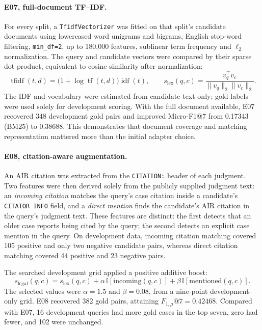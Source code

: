 \paragraph{E07, full-document TF--IDF.}
For every split, a \texttt{TfidfVectorizer} was fitted on that split's
candidate documents using lowercased word unigrams and bigrams,
English stop-word filtering, \texttt{min\_df=2}, up to 180,000 features,
sublinear term frequency and $\ell_2$ normalization. The query and candidate
vectors were compared by their sparse dot product, equivalent to cosine
similarity after normalization:
\begin{equation}
\operatorname{tfidf}(t,d)
=\bigl(1+\log \operatorname{tf}(t,d)\bigr)\operatorname{idf}(t),
\qquad
s_{\mathrm{lex}}(q,c)=
\frac{v_q^\top v_c}{\|v_q\|_2\|v_c\|_2}.
\end{equation}
The IDF and vocabulary were estimated from candidate text only; gold labels
were used solely for development scoring. With the full document available,
E07 recovered 348 development gold pairs and improved Micro-F1@7 from
0.17343 (BM25) to 0.38688. This demonstrates that document coverage and
matching representation mattered more than the initial adapter choice.

\paragraph{E08, citation-aware augmentation.}
An AIR citation was extracted from the \texttt{CITATION:} header of each
judgment. Two features were then derived solely from the publicly supplied
judgment text: an \emph{incoming citation} matches the query's case citation
inside a candidate's \texttt{CITATOR INFO} field, and a \emph{direct mention}
finds the candidate's AIR citation in the query's judgment text. These
features are distinct: the first detects that an older case reports being
cited by the query; the second detects an explicit case mention in the query.
On development data, incoming citation matching covered 105 positive and only
two negative candidate pairs, whereas direct citation matching covered 44
positive and 23 negative pairs.

The searched development grid applied a positive additive boost:
\begin{equation}
\label{eq:p7-cite}
 s_{\mathrm{legal}}(q,c)
 =s_{\mathrm{lex}}(q,c)
 +\alpha\,\mathbb{I}[\mathrm{incoming}(q,c)]
 +\beta\,\mathbb{I}[\mathrm{mentioned}(q,c)].
\end{equation}
The selected values were $\alpha=1.5$ and $\beta=0.08$, from a nine-point
development-only grid. E08 recovered 382 gold pairs, attaining
$F_{1,\mu}@7=0.42468$. Compared with E07, 16 development queries had more
gold cases in the top seven, zero had fewer, and 102 were unchanged.

